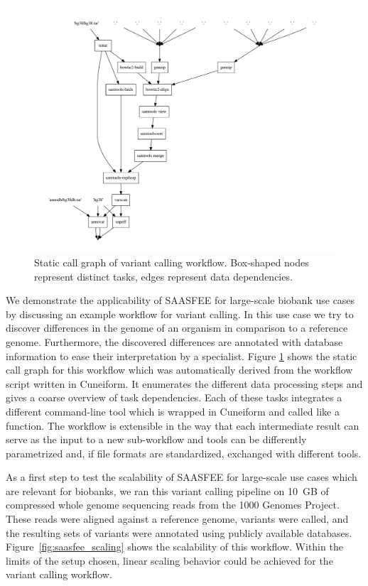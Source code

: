
\begin{figure}
  \centering
  \includegraphics[width=.85\textwidth]{imgs/variant_call11b.pdf}
  \caption{Static call graph of variant calling workflow. Box-shaped nodes represent distinct tasks, edges represent data dependencies.}
  \label{fig:variant_call}
\end{figure}

We demonstrate the applicability of SAASFEE for large-scale biobank use cases by discussing an example workflow for variant calling. In this use case we try to discover differences in the genome of an organism in comparison to a reference genome. Furthermore, the discovered differences are annotated with database information to ease their interpretation by a specialist. Figure \ref{fig:variant_call} shows the static call graph for this workflow which was automatically derived from the workflow script written in Cuneiform. It enumerates the different data processing steps and gives a coarse overview of task dependencies. Each of these tasks integrates a different command-line tool which is wrapped in Cuneiform and called like a function. The workflow is extensible in the way that each intermediate result can serve as the input to a new sub-workflow and tools can be differently parametrized and, if file formats are standardized, exchanged with different tools.




As a first step to test the scalability of SAASFEE for large-scale use cases which are relevant for biobanks, we ran this variant calling pipeline on 10~GB of compressed whole genome sequencing reads from the 1000 Genomes Project. These reads were aligned against a reference genome, variants were called, and the resulting sets of variants were annotated using publicly available databases. Figure~\ref{fig:saasfee_scaling} shows the scalability of this workflow. Within the limits of the setup chosen, linear scaling behavior could be achieved for the variant calling workflow.

